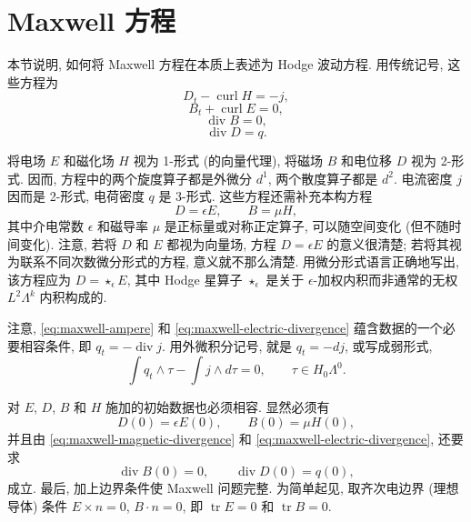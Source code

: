 \section{Maxwell 方程}\label{sec:maxwell-equations}

本节说明, 如何将 Maxwell 方程在本质上表述为 Hodge 波动方程. 用传统记号, 这些方程为
\begin{equation}\label{eq:maxwell-ampere}D_t-\operatorname{curl}H=-j,\end{equation}
\begin{equation}\label{eq:maxwell-faraday}B_t+\operatorname{curl}E=0,\end{equation}
\begin{equation}\label{eq:maxwell-magnetic-divergence}\operatorname{div}B=0,\end{equation}
\begin{equation}\label{eq:maxwell-electric-divergence}\operatorname{div}D=q.\end{equation}

将电场 $E$ 和磁化场 $H$ 视为 1-形式 (的向量代理), 将磁场 $B$ 和电位移 $D$ 视为 2-形式. 因而, 方程中的两个旋度算子都是外微分 $d^1$, 两个散度算子都是 $d^2$. 电流密度 $j$ 因而是 2-形式, 电荷密度 $q$ 是 3-形式. 这些方程还需补充本构方程
\[
D=\epsilon E,\qquad B=\mu H,
\]
其中介电常数 $\epsilon$ 和磁导率 $\mu$ 是正标量或对称正定算子, 可以随空间变化 (但不随时间变化). 注意, 若将 $D$ 和 $E$ 都视为向量场, 方程 $D=\epsilon E$ 的意义很清楚; 若将其视为联系不同次数微分形式的方程, 意义就不那么清楚. 用微分形式语言正确地写出, 该方程应为 $D=\star_\epsilon E$, 其中 Hodge 星算子 $\star_\epsilon$ 是关于 $\epsilon$-加权内积而非通常的无权 $L^2\Lambda^k$ 内积构成的.

注意, \eqref{eq:maxwell-ampere} 和 \eqref{eq:maxwell-electric-divergence} 蕴含数据的一个必要相容条件, 即 $q_t=-\operatorname{div}j$. 用外微积分记号, 就是 $q_t=-dj$, 或写成弱形式,
\begin{equation}\label{eq:maxwell-data-compatibility}
\int q_t\wedge\tau-\int j\wedge d\tau=0,\qquad\tau\in H_{0}\Lambda^0.
\end{equation}

对 $E$, $D$, $B$ 和 $H$ 施加的初始数据也必须相容. 显然必须有
\[
D(0)=\epsilon E(0),\qquad B(0)=\mu H(0),
\]
并且由 \eqref{eq:maxwell-magnetic-divergence} 和 \eqref{eq:maxwell-electric-divergence}, 还要求
\[
\operatorname{div}B(0)=0,\qquad\operatorname{div}D(0)=q(0),
\]
成立. 最后, 加上边界条件使 Maxwell 问题完整. 为简单起见, 取齐次电边界 (理想导体) 条件 $E\times n=0$, $B\cdot n=0$, 即 $\operatorname{tr}E=0$ 和 $\operatorname{tr}B=0$.

